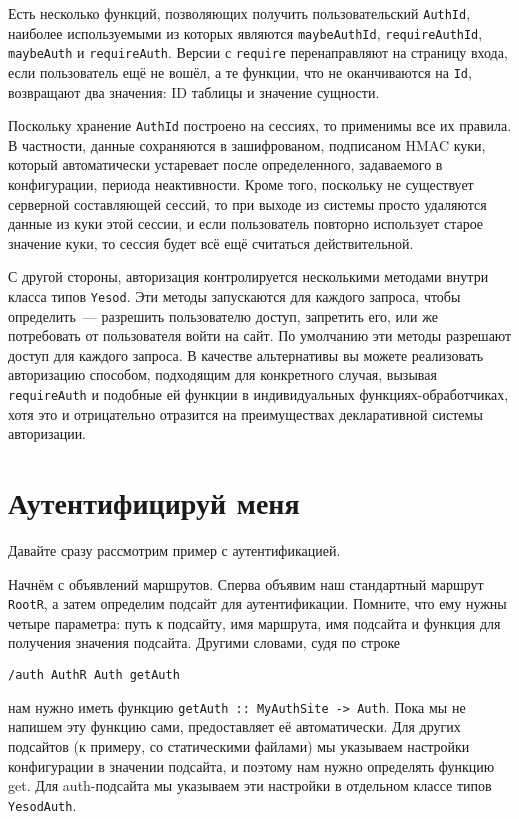 Есть несколько функций, позволяющих получить пользовательский \lstinline'AuthId', наиболее используемыми из которых являются \lstinline'maybeAuthId', \lstinline'requireAuthId', \lstinline'maybeAuth' и \lstinline'requireAuth'. Версии с \lstinline'require' перенаправляют на страницу входа, если пользователь ещё не вошёл, а те функции, что не оканчиваются на \lstinline'Id', возвращают два значения: ID таблицы и значение сущности.

Поскольку хранение \lstinline'AuthId' построено на сессиях, то применимы все их правила. В частности, данные сохраняются в зашифрованом, подписаном HMAC куки, который автоматически устаревает после определенного, задаваемого в конфигурации, периода неактивности. Кроме того, поскольку не существует серверной составляющей сессий, то при выходе из системы просто удаляются данные из куки этой сессии, и если пользователь повторно использует старое значение куки, то сессия будет всё ещё считаться действительной.

С другой стороны, авторизация контролируется несколькими методами внутри класса типов \lstinline'Yesod'. Эти методы запускаются для каждого запроса, чтобы определить~--- разрешить пользователю доступ, запретить его, или же потребовать от пользователя войти на сайт. По умолчанию эти методы разрешают доступ для каждого запроса. В качестве альтернативы вы можете реализовать авторизацию способом, подходящим для конкретного случая, вызывая \lstinline'requireAuth' и подобные ей функции в индивидуальных функциях-обработчиках, хотя это и отрицательно отразится на преимуществах декларативной системы авторизации.

\section{Аутентифицируй меня}

Давайте сразу рассмотрим пример с аутентификацией.


Начнём с объявлений маршрутов. Сперва объявим наш стандартный маршрут \lstinline'RootR', а затем определим подсайт для аутентификации. Помните, что ему нужны четыре параметра: путь к подсайту, имя маршрута, имя подсайта и функция для получения значения подсайта. Другими словами, судя по строке

\begin{lstlisting}
/auth AuthR Auth getAuth
\end{lstlisting}

нам нужно иметь функцию \lstinline'getAuth :: MyAuthSite -> Auth'. Пока мы не напишем эту функцию сами,  предоставляет её автоматически. Для других подсайтов (к примеру, со статическими файлами) мы указываем настройки конфигурации в значении подсайта, и поэтому нам нужно определять функцию get. Для auth-подсайта мы указываем эти настройки в отдельном классе типов \lstinline'YesodAuth'.


